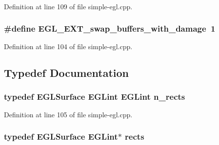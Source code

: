 Definition at line 109 of file simple-\/egl.\+cpp.

\subsubsection[{\texorpdfstring{E\+G\+L\+\_\+\+E\+X\+T\+\_\+swap\+\_\+buffers\+\_\+with\+\_\+damage}{EGL_EXT_swap_buffers_with_damage}}]{\setlength{\rightskip}{0pt plus 5cm}\#define E\+G\+L\+\_\+\+E\+X\+T\+\_\+swap\+\_\+buffers\+\_\+with\+\_\+damage~1}\hypertarget{simple-egl_8cpp_a083d37f289b99270e0391419178d458f}{}\label{simple-egl_8cpp_a083d37f289b99270e0391419178d458f}


Definition at line 104 of file simple-\/egl.\+cpp.



\subsection{Typedef Documentation}
\subsubsection[{\texorpdfstring{n\+\_\+rects}{n_rects}}]{\setlength{\rightskip}{0pt plus 5cm}typedef E\+G\+L\+Surface E\+G\+Lint E\+G\+Lint {\bf n\+\_\+rects}}\hypertarget{simple-egl_8cpp_aa6a11810244355f89e6c4961b9dd3b53}{}\label{simple-egl_8cpp_aa6a11810244355f89e6c4961b9dd3b53}


Definition at line 105 of file simple-\/egl.\+cpp.

\subsubsection[{\texorpdfstring{rects}{rects}}]{\setlength{\rightskip}{0pt plus 5cm}typedef E\+G\+L\+Surface E\+G\+Lint$\ast$ {\bf rects}}\hypertarget{simple-egl_8cpp_a56616f7ca3fc53c0da41d05de9330b11}{}\label{simple-egl_8cpp_a56616f7ca3fc53c0da41d05de9330b11}


